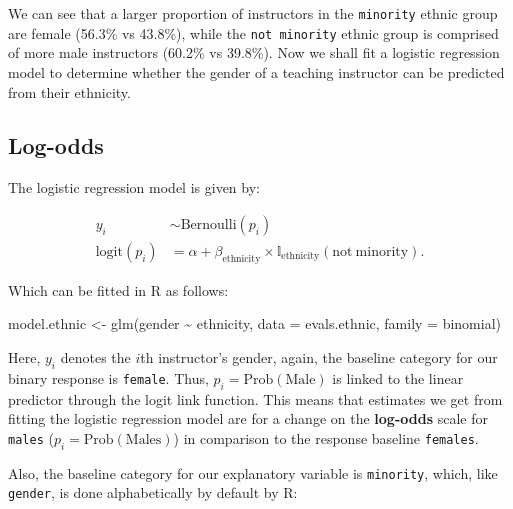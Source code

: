 \documentclass[
  letterpaper,
  DIV=11,
  numbers=noendperiod]{scrartcl}
\newenvironment{Shaded}{\begin{snugshade}}{\end{snugshade}}
\newcommand{\AttributeTok}[1]{\textcolor[rgb]{0.40,0.45,0.13}{#1}}
\newcommand{\FunctionTok}[1]{\textcolor[rgb]{0.28,0.35,0.67}{#1}}
\newcommand{\NormalTok}[1]{\textcolor[rgb]{0.00,0.23,0.31}{#1}}
\newcommand{\OtherTok}[1]{\textcolor[rgb]{0.00,0.23,0.31}{#1}}
\newcommand{\SpecialCharTok}[1]{\textcolor[rgb]{0.37,0.37,0.37}{#1}}
\begin{document}
We can see that a larger proportion of instructors in the
\texttt{minority} ethnic group are female (56.3\% vs 43.8\%), while the
\texttt{not\ minority} ethnic group is comprised of more male
instructors (60.2\% vs 39.8\%). Now we shall fit a logistic regression
model to determine whether the gender of a teaching instructor can be
predicted from their ethnicity.

\subsection{Log-odds}\label{log-odds-1}

The logistic regression model is given by:

\begin{align}
y_i &\sim \mathrm{Bernoulli}(p_i)\\
\mathrm{logit}(p_i) &= \alpha +  \beta_{\text{ethnicity}}  \times \mathbb{I}_{\text{ethnicity}}(\mathrm{not~  minority}).
\end{align}

Which can be fitted in R as follows:

\begin{Shaded}
\begin{Highlighting}[]
\NormalTok{model.ethnic }\OtherTok{\textless{}{-}} \FunctionTok{glm}\NormalTok{(gender }\SpecialCharTok{\textasciitilde{}}\NormalTok{ ethnicity,}
                    \AttributeTok{data =}\NormalTok{ evals.ethnic,}
                    \AttributeTok{family =}\NormalTok{ binomial) }
\end{Highlighting}
\end{Shaded}

Here, \(y_i\) denotes the \(i\)th instructor's gender, again, the
baseline category for our binary response is \texttt{female}. Thus,
\(p_i = \mathrm{Prob}(\mathrm{Male})\) is linked to the linear predictor
through the logit link function. This means that estimates we get from
fitting the logistic regression model are for a change on the
\textbf{log-odds} scale for \texttt{males}
(\(p_i = \textrm{Prob}(\textrm{Males})\)) in comparison to the response
baseline \texttt{females}.

Also, the baseline category for our explanatory variable is
\texttt{minority}, which, like \texttt{gender}, is done alphabetically
by default by R:

\begin{Shaded}
\end{Shaded}
\end{document}
